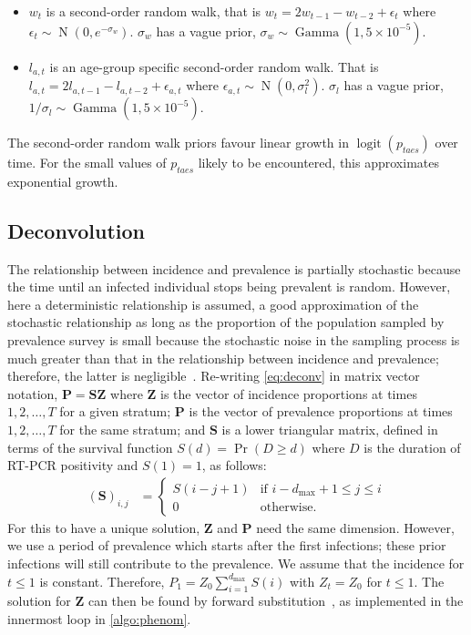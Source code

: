 \documentclass[9pt,twocolumn,twoside]{pnas-new}
\newcommand{\dmax}{d_\text{max}}
\DeclareMathOperator{\prob}{\mathrm{Pr}}
\def\dist{\sim}
\DeclareMathOperator{\GamDist}{Gamma}
\DeclareMathOperator{\N}{N}
\DeclareMathOperator{\logit}{logit}
\newcommand\matr{\bm}
\renewcommand{\vec}[1]{\bm{#1}}
\begin{document}
\begin{itemize}
    We chose this distribution's parameter such that $\prob(\sigma_1 > 1) = 0.1$.
    Similarly $v_e \dist \N(0, \sigma_2^2)$ with $\sigma_2$ having the same prior as $\sigma_1$.
    \item $w_t$ is a second-order random walk, that is $w_t = 2w_{t-1} - w_{t-2} + \epsilon_t$ where $\epsilon_t \dist \N(0, e^{-\sigma_w})$.
      $\sigma_w$ has a vague prior, $\sigma_w \dist \GamDist(1, 5 \times 10^{-5})$.
    \item $l_{a,t}$ is an age-group specific second-order random walk.
      That is $l_{a,t} = 2l_{a,t-1} - l_{a,t-2} + \epsilon_{a,t}$ where $\epsilon_{a,t} \dist \N(0, \sigma_l^2)$.
      $\sigma_l$ has a vague prior, $1/\sigma_l \dist \GamDist(1, 5 \times 10^{-5})$.
\end{itemize}
The second-order random walk priors favour linear growth in $\logit(p_{taes})$ over time.
For the small values of $p_{taes}$ likely to be encountered, this approximates exponential growth.

\subsection*{Deconvolution}

The relationship between incidence and prevalence is partially stochastic because the time until an infected individual stops being prevalent is random.
However, here a deterministic relationship is assumed, a good approximation of the stochastic relationship as long as the proportion of the population sampled by prevalence survey is small because the stochastic noise in the sampling process is much greater than that in the relationship between incidence and prevalence; therefore, the latter is negligible~\citep{blakeThesis}.
Re-writing \cref{eq:deconv} in matrix vector notation, $\vec{P} = \matr{S} \vec{Z}$ where $\vec{Z}$ is the vector of incidence proportions at times $1, 2, \dots, T$ for a given stratum; $\vec{P}$ is the vector of prevalence proportions at times $1, 2, \dots, T$ for the same stratum; and $\matr{S}$ is a lower triangular matrix, defined in terms of the survival function $S(d) = \prob(D \geq d)$ where $D$ is the duration of RT-PCR positivity and $S(1) = 1$, as follows:
\begin{align}
    (\matr{S})_{i,j} &= \begin{cases}
        S(i - j + 1) & \text{if } i - \dmax + 1 \leq j \leq i \\
        0 & \text{otherwise.}
    \end{cases} \label{inc-prev:eq:Smatrix}
\end{align}
For this to have a unique solution, $\vec{Z}$ and $\vec{P}$ need the same dimension.
However, we use a period of prevalence which starts after the first infections; these prior infections will still contribute to the prevalence.
We assume that the incidence for $t \leq 1$ is constant.
Therefore, $P_1 = Z_0 \sum_{i=1}^{\dmax} S(i)$ with $Z_t = Z_0$ for $t \leq 1$.
The solution for $\vec{Z}$ can then be found by forward substitution~\citep{cormenMatrix}, as implemented in the innermost loop in \cref{algo:phenom}.
\end{document}
